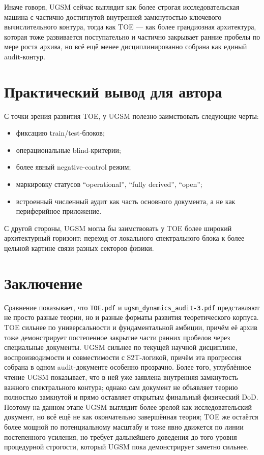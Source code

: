 \documentclass[12pt,a4paper]{article}
\begin{document}
Иначе говоря, UGSM сейчас выглядит как более строгая исследовательская машина с частично достигнутой внутренней замкнутостью ключевого вычислительного контура, тогда как TOE --- как более грандиозная архитектура, которая тоже развивается поступательно и частично закрывает ранние пробелы по мере роста архива, но всё ещё менее дисциплинированно собрана как единый audit-контур.

\section{Практический вывод для автора}

С точки зрения развития TOE, у UGSM полезно заимствовать следующие черты:
\begin{itemize}
    \item фиксацию train/test-блоков;
    \item операциональные blind-критерии;
    \item более явный negative-control режим;
    \item маркировку статусов ``operational'', ``fully derived'', ``open'';
    \item встроенный численный аудит как часть основного документа, а не как периферийное приложение.
\end{itemize}

С другой стороны, UGSM могла бы заимствовать у TOE более широкий архитектурный горизонт: переход от локального спектрального блока к более цельной картине связи разных секторов физики.

\section{Заключение}

Сравнение показывает, что \texttt{TOE.pdf} и \texttt{ugsm\_dynamics\_audit-3.pdf} представляют не просто разные теории, но и разные форматы развития теоретического корпуса. TOE сильнее по универсальности и фундаментальной амбиции, причём её архив тоже демонстрирует постепенное закрытие части ранних пробелов через специальные документы. UGSM сильнее по текущей научной дисциплине, воспроизводимости и совместимости с S2T-логикой, причём эта прогрессия собрана в одном audit-документе особенно прозрачно. Более того, углублённое чтение UGSM показывает, что в ней уже заявлена внутренняя замкнутость важного спектрального контура; однако сам документ не объявляет теорию полностью замкнутой и прямо оставляет открытым финальный физический DoD. Поэтому на данном этапе UGSM выглядит более зрелой как исследовательский документ, но всё ещё не как окончательно завершённая теория; TOE же остаётся более мощной по потенциальному масштабу и тоже явно движется по линии постепенного усиления, но требует дальнейшего доведения до того уровня процедурной строгости, который UGSM пока демонстрирует заметно сильнее.
\end{document}
